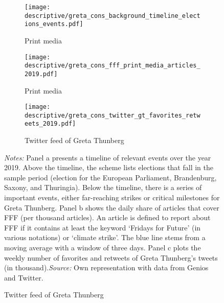 \documentclass[11pt, a4paper]{article} %
\begin{document}
\newpage




\begin{landscape}
	\vspace*{\fill}
	\begin{figure}[H]\centering\caption{Important events surrounding FFF and perception in (social) media}

		
		
	
	
	
	
	\begin{subfigure}[h]{0.85\linewidth}\centering\caption{Print media}
		\texttt{[image: descriptive/greta\_cons\_background\_timeline\_elections\_events.pdf]}
	\end{subfigure}
	
	
	\par\bigskip\smallskip %
		\begin{subfigure}[h]{0.43\linewidth}\centering\caption{Print media}
			\texttt{[image: descriptive/greta\_cons\_fff\_print\_media\_articles\_2019.pdf]}
		\end{subfigure}
		\begin{subfigure}[h]{0.43\linewidth}\centering\caption{Twitter feed of Greta Thunberg}
			\texttt{[image: descriptive/greta\_cons\_twitter\_gt\_favorites\_retweets\_2019.pdf]}
		\end{subfigure}
		
		\begin{minipage}{0.86\linewidth}
			\scriptsize{\emph{Notes:} Panel a presents a timeline of relevant events over the year 2019. Above the timeline, the scheme lists elections that fall in the sample period (election for the European Parliament, Brandenburg, Saxony, and Thuringia). Below the timeline, there is a series of important events, either far-reaching strikes or critical milestones for Greta Thunberg. Panel b shows the daily share of articles that cover FFF (per thousand articles). An article is defined to report about FFF if it contains at least the keyword `Fridays for Future' (in various notations) or `climate strike'. The blue line stems from a moving average with a window of three days. Panel c plots the weekly number of favorites and retweets of Greta Thunberg's tweets (in thousand).\newline \emph{Source:} Own representation with data from Genios and Twitter.}
		\end{minipage}
	\end{figure}
	\vspace*{\fill}\clearpage
\end{landscape}
\restoregeometry
\end{document}
